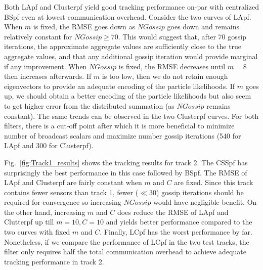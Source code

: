 \documentclass[10pt,letterpaper,final]{article}
\begin{document}
Both LApf and Clusterpf yield good tracking performance on-par with centralized BSpf even at lowest communication overhead. Consider the two curves of LApf. When $m$ is fixed, the RMSE goes down as $NGossip$ goes down and remains relatively constant for $NGossip\geq 70$. This would suggest that, after 70 gossip iterations, the approximate aggregate values are sufficiently close to the true aggregate values, and that any additional gossip iteration would provide marginal if any improvement. When $NGossip$ is fixed, the RMSE decreases until $m=8$ then increases afterwards. If $m$ is too low, then we do not retain enough eigenvectors to provide an adequate encoding of the particle likelihoods. If $m$ goes up, we should obtain a better encoding of the particle likelihoods but also seem to get higher error from the distributed summation (as $NGossip$ remains constant). The same trends can be observed in the two Clusterpf curves. For both filters, there is a cut-off point after which it is more beneficial to minimize number of broadcast scalars and maximize number gossip iterations (540 for LApf and 300 for Clusterpf). 


Fig.~\ref{fig:Track1_results} shows the tracking results for track 2. The CSSpf has surprisingly the best performance in this case followed by BSpf. The RMSE of LApf and Clusterpf are fairly constant when $m$ and $C$ are fixed. Since this track contains fewer sensors than track 1, fewer ($\ll 30$) gossip iterations should be required for convergence so increasing $NGossip$ would have negligible benefit. On the other hand, increasing $m$ and $C$ does reduce the RMSE of LApf and Clutterpf up till $m=10, C=10$ and yields better performance compared to the two curves with fixed $m$ and $C$. Finally, LCpf has the worst performance by far. Nonetheless, if we compare the performance of LCpf in the two test tracks, the filter only requires half the total communication overhead to achieve adequate tracking performance in track 2. 
\end{document}
